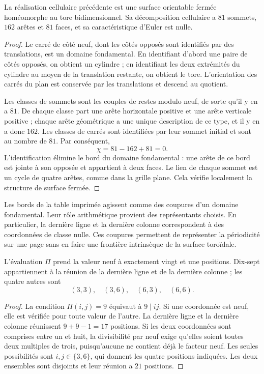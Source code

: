 \begin{proposicion}
\label{geo:prop-toro}
La réalisation cellulaire précédente est une surface orientable fermée homéomorphe au tore bidimensionnel. Sa décomposition cellulaire a $81$ sommets, $162$ arêtes et $81$ faces, et sa caractéristique d'Euler est nulle.
\end{proposicion}

\begin{proof}
Le carré de côté neuf, dont les côtés opposés sont identifiés par des translations, est un domaine fondamental. En identifiant d'abord une paire de côtés opposés, on obtient un cylindre ; en identifiant les deux extrémités du cylindre au moyen de la translation restante, on obtient le tore. L'orientation des carrés du plan est conservée par les translations et descend au quotient.

Les classes de sommets sont les couples de restes modulo neuf, de sorte qu'il y en a $81$. De chaque classe part une arête horizontale positive et une arête verticale positive ; chaque arête géométrique a une unique description de ce type, et il y en a donc $162$. Les classes de carrés sont identifiées par leur sommet initial et sont au nombre de $81$. Par conséquent,
\[
 \chi=81-162+81=0.
\]
L'identification élimine le bord du domaine fondamental : une arête de ce bord est jointe à son opposée et appartient à deux faces. Le lien de chaque sommet est un cycle de quatre arêtes, comme dans la grille plane. Cela vérifie localement la structure de surface fermée.
\end{proof}

Les bords de la table imprimée agissent comme des coupures d'un domaine fondamental. Leur rôle arithmétique provient des représentants choisis. En particulier, la dernière ligne et la dernière colonne correspondent à des coordonnées de classe nulle. Ces coupures permettent de représenter la périodicité sur une page sans en faire une frontière intrinsèque de la surface toroïdale.

\begin{proposicion}
\label{geo:prop-ceros}
L'évaluation $\Pi$ prend la valeur neuf à exactement vingt et une positions. Dix-sept appartiennent à la réunion de la dernière ligne et de la dernière colonne ; les quatre autres sont
\[
 (3,3),\quad(3,6),\quad(6,3),\quad(6,6).
\]
\end{proposicion}

\begin{proof}
La condition $\Pi(i,j)=9$ équivaut à $9\mid ij$. Si une coordonnée est neuf, elle est vérifiée pour toute valeur de l'autre. La dernière ligne et la dernière colonne réunissent $9+9-1=17$ positions. Si les deux coordonnées sont comprises entre un et huit, la divisibilité par neuf exige qu'elles soient toutes deux multiples de trois, puisqu'aucune ne contient déjà le facteur neuf. Les seules possibilités sont $i,j\in\{3,6\}$, qui donnent les quatre positions indiquées. Les deux ensembles sont disjoints et leur réunion a $21$ positions.
\end{proof}

